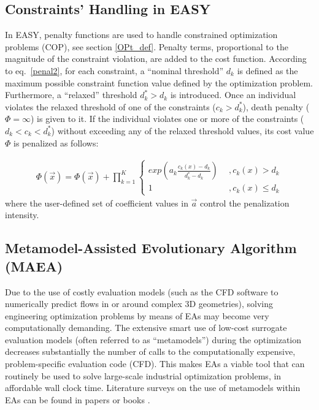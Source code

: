 \subsection{Constraints' Handling in EASY}
\label{COP}
In EASY, penalty functions are used to handle constrained optimization problems (COP), see section \ref{OPt_def}. Penalty terms, proportional to the magnitude of the constraint violation, are added to the cost function. According to eq.\ \ref{penal2}, for each constraint, a ``nominal threshold'' $d_k$ is defined as the maximum possible constraint function value defined by the optimization problem. Furthermore, a ``relaxed'' threshold $d_k^* > d_k$ is introduced. Once an individual violates the relaxed threshold of one of the constraints ($c_k \! > \! d_k^*$), death penalty ($\Phi \! = \! \infty$) is given to it. If the individual violates one or more of the constraints ($d_k \! < \! c_k \! < \! d_k^*$) without exceeding any of the relaxed threshold values, its cost value $\Phi$ is penalized as follows:

\begin{eqnarray}
	\Phi(\vec{x})=\Phi(\vec{x})+ \prod _{k=1}^K{\left\{ 				\begin{array}{ll}
    exp(a_k\frac{c_k(x)-d_k}{d_k^* -d_k}) & ~~,c_k(x)>d_k\\
    1 & ~~,c_k(x)\leq d_k\end{array} \right. }
    \label{penal2}
\end{eqnarray}  
where the user-defined set of coefficient values in $\vec{a}$ control the penalization intensity.

 

\subsection{Metamodel-Assisted Evolutionary Algorithm (MAEA)}
\label{MAEApar}
Due to the use of costly evaluation models (such as the CFD software to numerically predict flows in or around complex 3D geometries), solving engineering optimization problems by means of EAs may become very computationally demanding. The extensive smart use of low-cost surrogate evaluation models (often referred to as ``metamodels'') during the optimization decreases substantially the number of calls to the computationally expensive, problem-specific evaluation code (CFD). This makes EAs a viable tool that can routinely be used to solve large-scale industrial optimization problems, in affordable wall clock time. Literature surveys on the use of metamodels within EAs can be found in papers \cite{LTT_2_020,Jin2002,LTT_2_027,EBNK} or books \cite{KEANEbook}.


